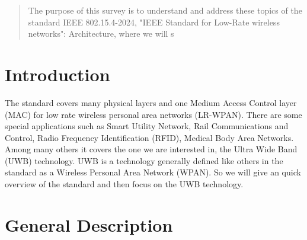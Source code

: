 \documentclass[conference]{IEEEtran}
\begin{document}




\maketitle

\begin{abstract}
The purpose of this survey is to understand and address these topics of the standard IEEE 802.15.4-2024,
"IEEE Standard for Low-Rate wireless networks":
Architecture, where we will s

\end{abstract}





%
\IEEEpeerreviewmaketitle



\section{Introduction}
The standard covers many physical layers and one Medium Access Control layer (MAC) for 
low rate wireless personal area networks (LR-WPAN).
There are some special applications such as Smart Utility Network, 
Rail Communications and Control, Radio Frequency Identification (RFID),
Medical Body Area Networks. Among many others it covers the one we are interested in,
the Ultra Wide Band (UWB) technology.
UWB is a technology generally defined like others in the standard as a Wireless Personal Area Network 
(WPAN). So we will give an quick overview of the standard and then focus on the UWB technology.

% 

\section{General Description}
\end{document}
